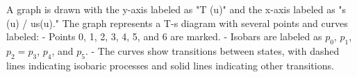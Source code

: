 A graph is drawn with the y-axis labeled as "T (u)" and the x-axis labeled as "s (u) / us(u)." The graph represents a T-s diagram with several points and curves labeled:  
- Points 0, 1, 2, 3, 4, 5, and 6 are marked.  
- Isobars are labeled as \( p_0 \), \( p_1 \), \( p_2 = p_3 \), \( p_4 \), and \( p_5 \).  
- The curves show transitions between states, with dashed lines indicating isobaric processes and solid lines indicating other transitions.